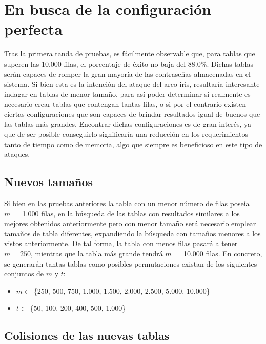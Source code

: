 \documentclass[12pt,spanish,listoffigures,listoftables]{tfgetsinf}
\begin{document}
\section{En busca de la configuración perfecta} \label{config perf}

Tras la primera tanda de pruebas, es fácilmente observable que, para tablas que superen las 10.000 filas, el porcentaje de éxito no baja del 88.0\%. Dichas tablas serán capaces de romper la gran mayoría de las contraseñas almacenadas en el sistema. Si bien esta es la intención del ataque del arco iris, resultaría interesante indagar en tablas de menor tamaño, para así poder determinar si realmente es necesario crear tablas que contengan tantas filas, o si por el contrario existen ciertas configuraciones que son capaces de brindar resultados igual de buenos que las tablas más grandes. Encontrar dichas configuraciones es de gran interés, ya que de ser posible conseguirlo significaría una reducción en los requerimientos tanto de tiempo como de memoria, algo que siempre es beneficioso en este tipo de ataques.

\subsection{Nuevos tamaños} \label{nuevos_tamaños}

Si bien en las pruebas anteriores la tabla con un menor número de filas poseía $m =$ 1.000 filas, en la búsqueda de las tablas con resultados similares a los mejores obtenidos anteriormente pero con menor tamaño será necesario emplear tamaños de tabla diferentes, expandiendo la búsqueda con tamaños menores a los vistos anteriormente. De tal forma, la tabla con menos filas pasará a tener $m = 250$, mientras que la tabla más grande tendrá $m =$ 10.000 filas. En concreto, se generarán tantas tablas como posibles permutaciones existan de los siguientes conjuntos de $m$ y $t$:
\\
\begin{itemize}

    \item $m \in$ \{250, 500, 750, 1.000, 1.500, 2.000, 2.500, 5.000, 10.000\}
    
    \item $t \in$ \{50, 100, 200, 400, 500, 1.000\}
    
\end{itemize}

\subsection{Colisiones de las nuevas tablas}
\end{document}
